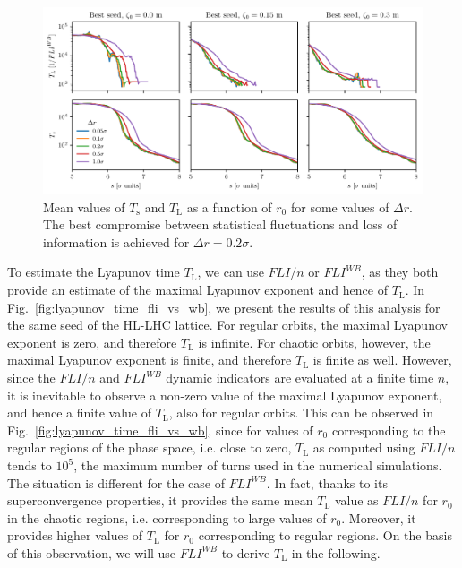 \begin{figure}
    \centering
    \includegraphics[width=1\textwidth]{6_lhc_dynamic_indicators/figs/lyapunov_time_vs_thickness.pdf}
    \caption{Mean values of $T_\mathrm{s}$ and $T_\mathrm{L}$ as a function of $r_0$ for some values of $\Delta r$. The best compromise between statistical fluctuations and loss of information is achieved for $\Delta r = 0.2\sigma$.}
    \label{fig:ts_vs_r0}
\end{figure}

To estimate the Lyapunov time $T_\mathrm{L}$, we can use $FLI/n$ or $FLI^{{WB}}$, as they both provide an estimate of the maximal Lyapunov exponent and hence of $T_\mathrm{L}$. In Fig.~\ref{fig:lyapunov_time_fli_vs_wb}, we present the results of this analysis for the same seed of the HL-LHC lattice. For regular orbits, the maximal Lyapunov exponent is zero, and therefore $T_\mathrm{L}$ is infinite. For chaotic orbits, however, the maximal Lyapunov exponent is finite, and therefore $T_\mathrm{L}$ is finite as well. However, since the $FLI/n$ and $FLI^{WB}$ dynamic indicators are evaluated at a finite time $n$, it is inevitable to observe a non-zero value of the maximal Lyapunov exponent, and hence a finite value of $T_\mathrm{L}$, also for regular orbits. This can be observed in Fig.~\ref{fig:lyapunov_time_fli_vs_wb}, since for values of $r_0$ corresponding to the regular regions of the phase space, i.e. close to zero, $T_\mathrm{L}$ as computed using $FLI/n$ tends to $10^5$, the maximum number of turns used in the numerical simulations. The situation is different for the case of $FLI^{{WB}}$. In fact, thanks to its superconvergence properties, it provides the same mean $T_\mathrm{L}$ value as $FLI/n$ for $r_0$ in the chaotic regions, i.e. corresponding to large values of $r_0$. Moreover, it provides higher values of $T_\mathrm{L}$ for $r_0$ corresponding to regular regions. 
On the basis of this observation, we will use $FLI^{{WB}}$ to derive $T_\mathrm{L}$ in the following.

